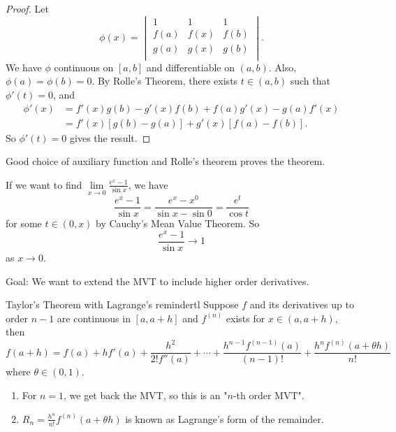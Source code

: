 \begin{proof}
    Let
    \[
        \phi(x) = \begin{vmatrix}
            1 & 1 &  1 \\
            f(a) & f(x) &  f(b) \\
            g(a) & g(x) &  g(b) \\
        \end{vmatrix}.
    \]
    We have \(\phi\) continuous on \([a,b]\) and differentiable on \((a,b)\). Also, \(\phi(a) = \phi(b) = 0\). By Rolle's Theorem, there exists \(t \in (a,b)\) such that \(\phi'(t) = 0\), and
    \begin{align*}
        \phi'(x) &= f'(x)g(b) - g'(x)f(b)+f(a)g'(x)-g(a)f'(x)\\
        &= f'(x)[g(b) - g(a)] + g'(x)[f(a) - f(b)].
    \end{align*}
    So \(\phi'(t) = 0\) gives the result.
\end{proof}
\begin{note}
Good choice of auxiliary function and Rolle's theorem proves the theorem.
\end{note}
\begin{example}
    If we want to find \(\lim\limits_{x \to 0} \frac{e^{x}-1}{\sin x}\), we have
    \[
        \frac{e^x - 1}{\sin x} = \frac{e^x - x^0}{\sin x - \sin 0}= \frac{e^t}{\cos t}
    \]
    for some \(t \in (0,x)\) by Cauchy's Mean Value Theorem. So
    \[
        \frac{e^x - 1}{\sin x} \to 1
    \]
    as \(x \to 0\).
\end{example}
Goal: We want to extend the MVT to include higher order derivatives.
\begin{theorem}{Taylor's Theorem with Lagrange's reminder}{tl}
    Suppose \(f\) and its derivatives up to order \(n - 1\) are continuous in \([a, a + h]\) and \(f^{(n)}\) exists for \(x \in (a, a + h)\), then
    \[
        f(a + h) = f(a) + hf'(a) + \frac{h^2}{2!f''(a)} + \cdots + \frac{h^{n-1}f^{(n-1)}(a)}{(n-1)!} + \frac{h^n f^{(n)}(a + \theta h)}{n!}
    \]
    where \(\theta \in (0,1)\).
\end{theorem}
\begin{note}
    \leavevmode
    \begin{enumerate}
        \item For \(n = 1\), we get back the MVT, so this is an "\(n\)-th order MVT".
        \item \(R_n = \frac{h^n}{n!}f^{(n)}(a + \theta h)\) is known as Lagrange's form of the remainder.
    \end{enumerate}
\end{note}
